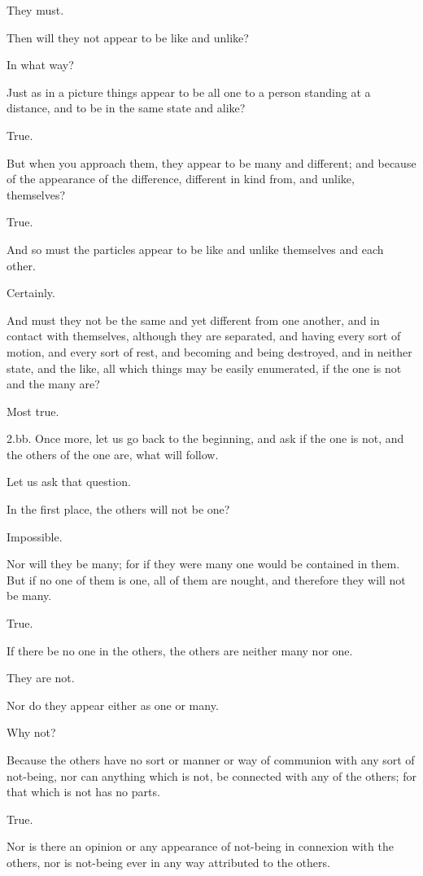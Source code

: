 They must.

Then will they not appear to be like and unlike?

In what way?

Just as in a picture things appear to be all one to a person standing at
a distance, and to be in the same state and alike?

True.

But when you approach them, they appear to be many and different; and
because of the appearance of the difference, different in kind from, and
unlike, themselves?

True.

And so must the particles appear to be like and unlike themselves and
each other.

Certainly.

And must they not be the same and yet different from one another, and in
contact with themselves, although they are separated, and having
every sort of motion, and every sort of rest, and becoming and being
destroyed, and in neither state, and the like, all which things may be
easily enumerated, if the one is not and the many are?

Most true.

2.bb. Once more, let us go back to the beginning, and ask if the one is
not, and the others of the one are, what will follow.

Let us ask that question.

In the first place, the others will not be one?

Impossible.

Nor will they be many; for if they were many one would be contained
in them. But if no one of them is one, all of them are nought, and
therefore they will not be many.

True.

If there be no one in the others, the others are neither many nor one.

They are not.

Nor do they appear either as one or many.

Why not?

Because the others have no sort or manner or way of communion with any
sort of not-being, nor can anything which is not, be connected with any
of the others; for that which is not has no parts.

True.

Nor is there an opinion or any appearance of not-being in connexion with
the others, nor is not-being ever in any way attributed to the others.

